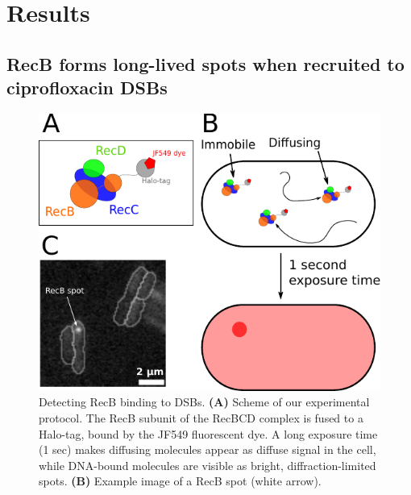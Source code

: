 \section*{Results}

\subsection*{RecB forms long-lived spots when recruited to cipro\-floxacin DSBs}

\begin{figure}[htbp]
    \centering
    \includegraphics[width=.8\textwidth]{Figures/Fig1_Exp_principle.pdf}
    \caption{Detecting RecB binding to DSBs. \textbf{(A)} Scheme of our experimental protocol. The RecB subunit of the RecBCD complex is fused to a Halo-tag, bound by the JF549 fluorescent dye\cite{Lepore2019a, Lepore2023}. A long exposure time (1 sec) makes diffusing molecules appear as diffuse signal in the cell, while DNA-bound molecules are visible as bright, diffraction-limited spots. \textbf{(B)} Example image of a RecB spot (white arrow).}
    \label{Fig:exp_principle}
\end{figure}

